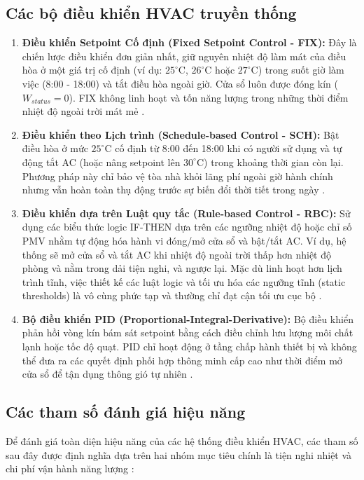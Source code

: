 \documentclass[12pt, a4paper]{report}
\begin{document}
\subsection{Các bộ điều khiển HVAC truyền thống}
\begin{enumerate}
    \item \textbf{Điều khiển Setpoint Cố định (Fixed Setpoint Control - FIX):} Đây là chiến lược điều khiển đơn giản nhất, giữ nguyên nhiệt độ làm mát của điều hòa ở một giá trị cố định (ví dụ: $25^\circ\text{C}$, $26^\circ\text{C}$ hoặc $27^\circ\text{C}$) trong suốt giờ làm việc (8:00 - 18:00) và tắt điều hòa ngoài giờ. Cửa sổ luôn được đóng kín ($W_{status} = 0$). FIX không linh hoạt và tốn năng lượng trong những thời điểm nhiệt độ ngoài trời mát mẻ \cite{whulx,iea_buildings}.
    \item \textbf{Điều khiển theo Lịch trình (Schedule-based Control - SCH):} Bật điều hòa ở mức $25^\circ\text{C}$ cố định từ 8:00 đến 18:00 khi có người sử dụng và tự động tắt AC (hoặc nâng setpoint lên $30^\circ\text{C}$) trong khoảng thời gian còn lại. Phương pháp này chỉ bảo vệ tòa nhà khỏi lãng phí ngoài giờ hành chính nhưng vẫn hoàn toàn thụ động trước sự biến đổi thời tiết trong ngày \cite{whulx}.
    \item \textbf{Điều khiển dựa trên Luật quy tắc (Rule-based Control - RBC):} Sử dụng các biểu thức logic IF-THEN dựa trên các ngưỡng nhiệt độ hoặc chỉ số PMV nhằm tự động hóa hành vi đóng/mở cửa sổ và bật/tắt AC. Ví dụ, hệ thống sẽ mở cửa sổ và tắt AC khi nhiệt độ ngoài trời thấp hơn nhiệt độ phòng và nằm trong dải tiện nghi, và ngược lại. Mặc dù linh hoạt hơn lịch trình tĩnh, việc thiết kế các luật logic và tối ưu hóa các ngưỡng tĩnh (static thresholds) là vô cùng phức tạp và thường chỉ đạt cận tối ưu cục bộ \cite{ashrae55,whulx}.
    \item \textbf{Bộ điều khiển PID (Proportional-Integral-Derivative):} Bộ điều khiển phản hồi vòng kín bám sát setpoint bằng cách điều chỉnh lưu lượng môi chất lạnh hoặc tốc độ quạt. PID chỉ hoạt động ở tầng chấp hành thiết bị và không thể đưa ra các quyết định phối hợp thông minh cấp cao như thời điểm mở cửa sổ để tận dụng thông gió tự nhiên \cite{whulx}.
\end{enumerate}

\subsection{Các tham số đánh giá hiệu năng}
Để đánh giá toàn diện hiệu năng của các hệ thống điều khiển HVAC, các tham số sau đây được định nghĩa dựa trên hai nhóm mục tiêu chính là tiện nghi nhiệt và chi phí vận hành năng lượng \cite{ashrae55,iea_buildings,whulx}:
\end{document}
